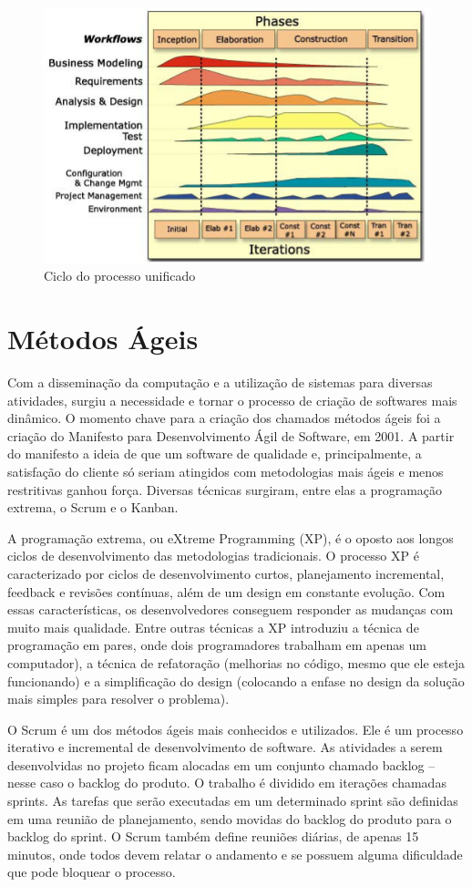 \begin{figure}[H]
    \centering
    \includegraphics[width=0.7\linewidth]{dados/figuras/metodologia}
    \caption{Ciclo do processo unificado}
    \label{fig:metodologia}
\end{figure}


\section{Métodos Ágeis}
\label{agil}

Com a disseminação da computação e a utilização de sistemas para diversas atividades, surgiu a necessidade e tornar o processo de criação de softwares mais dinâmico. O momento chave para a criação dos chamados métodos ágeis foi a criação do Manifesto para Desenvolvimento Ágil de Software, em 2001. A partir do manifesto a ideia de que um software de qualidade e, principalmente, a satisfação do cliente só seriam atingidos com metodologias mais ágeis e menos restritivas ganhou força. Diversas técnicas surgiram, entre elas a programação extrema, o Scrum e o Kanban.

A programação extrema, ou eXtreme Programming (XP), é o oposto aos longos ciclos de desenvolvimento das metodologias tradicionais. O processo XP é caracterizado por ciclos de desenvolvimento curtos, planejamento incremental, feedback e revisões contínuas, além de um design em constante evolução. Com essas características, os desenvolvedores conseguem responder as mudanças com muito mais qualidade. Entre outras técnicas a XP introduziu a técnica de programação em pares, onde dois programadores trabalham em apenas um computador), a técnica de refatoração (melhorias no código, mesmo que ele esteja funcionando) e a simplificação do design (colocando a enfase no design da solução mais simples para resolver o problema).

O Scrum é um dos métodos ágeis mais conhecidos e utilizados. Ele é um processo iterativo e incremental de desenvolvimento de software. As atividades a serem desenvolvidas no projeto ficam alocadas em um conjunto chamado backlog – nesse caso o backlog do produto. O trabalho é dividido em iterações chamadas sprints. As tarefas que serão executadas em um determinado sprint são definidas em uma reunião de planejamento, sendo movidas do backlog do produto para o backlog do sprint. O Scrum também define reuniões diárias, de apenas 15 minutos, onde todos devem relatar o andamento e se possuem alguma dificuldade que pode bloquear o processo.

